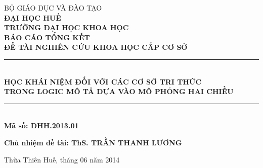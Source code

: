 \newcommand{\HRule}{\rule{\linewidth}{0.6mm}}
\begin{titlepage}
\begin{center}
\textsc{BỘ GIÁO DỤC VÀ ĐÀO TẠO}\\[0.0cm]
\textsc{\textbf{ĐẠI HỌC HUẾ}}\\[0.0cm]
{\textbf{TRƯỜNG ĐẠI HỌC KHOA HỌC}}\\[4.5cm]

\textsc{\LARGE \textbf{BÁO CÁO TỔNG KẾT}}\\[0.3cm]
\textsc{\Large \textbf{ĐỀ TÀI NGHIÊN CỨU KHOA HỌC CẤP CƠ SỞ}}\\[0.3cm]

\HRule \\[0.5cm]
{\large \bfseries HỌC KHÁI NIỆM ĐỐI VỚI CÁC CƠ SỞ TRI THỨC\\TRONG LOGIC MÔ TẢ DỰA VÀO MÔ PHỎNG HAI CHIỀU}\\[0.4cm]
\HRule \\[0.3cm]
\textbf{Mã số: DHH.2013.01}
\\[1.5cm]
\begin{minipage}{0.24\textwidth}
\begin{flushright} \large
\emph{}
\end{flushright}
\end{minipage}
\begin{minipage}{0.66\textwidth}
\begin{flushright} \large
\textbf{Chủ nhiệm đề tài: ThS. TRẦN THANH LƯƠNG}
\end{flushright}
\end{minipage}

\vfill
Thừa Thiên Huế, tháng 06 năm 2014
\vspace{-5ex}

\end{center}
\end{titlepage}

